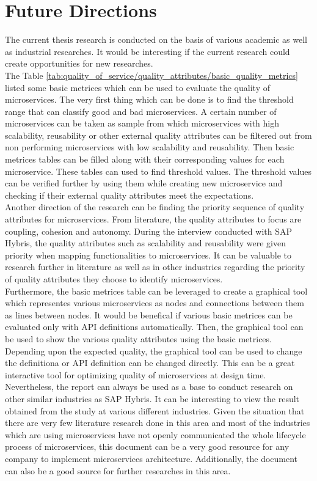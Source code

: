 \chapter{Future Directions}\label{chapter:future_directions}
The current thesis research is conducted on the basis of various academic as well as industrial researches. It would be interesting if the current research could create opportunities for new researches.\\
The Table \ref {tab:quality_of_service/quality_attributes/basic_quality_metrics} listed some basic metrices which can be used to evaluate the quality of microservices. The very first thing which can be done is to find the threshold range that can classify good and bad microservices. A certain number of microservices can be taken as sample from which microservices with high scalability, reusability or other external quality attributes can be filtered out from non performing microservices with low scalability and reusability. Then basic metrices tables can be filled along with their corresponding values for each microservice. These tables can used to find threshold values. The threshold values can be verified further by using them while creating new microservice and checking if their external quality attributes meet the expectations.\\
Another direction of the research can be finding the priority sequence of quality attributes for microservices. From literature, the quality attributes to focus are coupling, cohesion and autonomy. During the interview conducted with SAP Hybris, the quality attributes such as scalability and reusability were given priority when mapping functionalities to microservices. It can be valuable to research further in literature as well as in other industries regarding the priority of quality attributes they choose to identify microservices.\\
Furthermore, the basic metrices table can be leveraged to create a graphical tool which representes various microservices as nodes and connections between them as lines between nodes. It would be benefical if various basic metrices can be evaluated only with \acrshort{API} definitions automatically. Then, the graphical tool can be used to show the various quality attributes using the basic metrices. Depending upon the expected quality, the graphical tool can be used to change the definitiona or \acrshort{API} definition can be changed directly. This can be a great interactive tool for optimizing quality of microservices at design time.\\
Nevertheless, the report can always be used as a base to conduct research on other similar industries as SAP Hybris. It can be interesting to view the result obtained from the study at various different industries.
Given the situation that there are very few literature research done in this area and most of the industries which are using microservices have not openly communicated the whole lifecycle process of microservices, this document can be a very good resource for any company to implement microservices architecture. Additionally, the document can also be a good source for further researches in this area.
